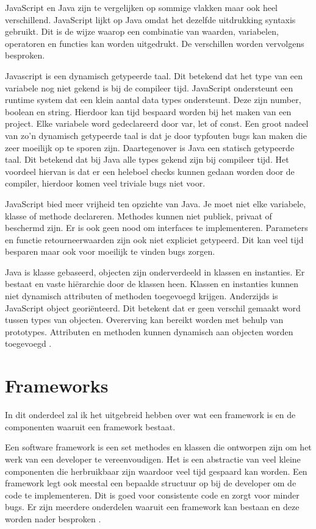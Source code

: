 JavaScript en Java zijn te vergelijken op sommige vlakken maar ook heel verschillend. JavaScript lijkt op Java omdat het dezelfde uitdrukking syntaxis gebruikt. Dit is de wijze waarop een combinatie van waarden, variabelen, operatoren en functies kan worden uitgedrukt. De verschillen worden vervolgens besproken.

Javascript is een dynamisch getypeerde taal. Dit betekend dat het type van een variabele nog niet gekend is bij de compileer tijd. JavaScript ondersteunt een runtime system dat een klein aantal data types ondersteunt. Deze zijn number, boolean en string. Hierdoor kan tijd bespaard worden bij het maken van een project. Elke variabele word gedeclareerd door var, let of const. Een groot nadeel van zo’n dynamisch getypeerde taal is dat je door typfouten bugs kan maken die zeer moeilijk op te sporen zijn. Daartegenover is Java een statisch getypeerde taal. Dit betekend dat bij Java alle types gekend zijn bij compileer tijd. Het voordeel hiervan is dat er een heleboel checks kunnen gedaan worden door de compiler, hierdoor komen veel triviale bugs niet voor.

JavaScript bied meer vrijheid ten opzichte van Java. Je moet niet elke variabele, klasse of methode declareren. Methodes kunnen niet publiek, privaat of beschermd zijn. Er is ook geen nood om interfaces te implementeren. Parameters en functie retourneerwaarden zijn ook niet expliciet getypeerd. Dit kan veel tijd besparen maar ook voor moeilijk te vinden bugs zorgen.

Java is klasse gebaseerd, objecten zijn onderverdeeld in klassen en instanties. Er bestaat en vaste hiërarchie door de klassen heen. Klassen en instanties kunnen niet dynamisch attributen of methoden toegevoegd krijgen. Anderzijds is JavaScript object georiënteerd. Dit betekent dat er geen verschil gemaakt word tussen types van objecten. Overerving kan bereikt worden met behulp van prototypes. Attributen en methoden kunnen dynamisch aan objecten worden toegevoegd \autocite{Introduction_2018}.

\section{Frameworks}
\label{sec:Frameworks}

In dit onderdeel zal ik het uitgebreid hebben over wat een framework is en de componenten waaruit een framework bestaat.

Een software framework is een set methodes en klassen die ontworpen zijn om het werk van een developer te vereenvoudigen. Het is een abstractie van veel kleine componenten die herbruikbaar zijn waardoor veel tijd gespaard kan worden. Een framework legt ook meestal een bepaalde structuur op bij de developer om de code te implementeren. Dit is goed voor consistente code en zorgt voor minder bugs. Er zijn meerdere onderdelen waaruit een framework kan bestaan en deze worden nader besproken \autocite{clifton_what_2003} \autocite{eskelin_software_2001}.

